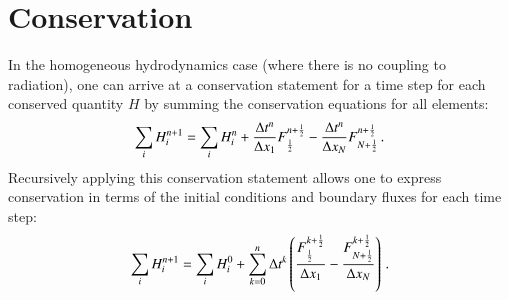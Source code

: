 \section{Conservation}
In the homogeneous hydrodynamics case (where there is no coupling to radiation),
one can arrive at a conservation statement for a time step for each conserved
quantity $H$ by summing the conservation equations for all elements:
\begin{equation}
   \sum\limits_i H_i^{n+1} = \sum\limits_i H_i^n
   + \frac{\Delta t^n}{\Delta x_1}F_{\frac{1}{2}}^{n+\frac{1}{2}}
   - \frac{\Delta t^n}{\Delta x_N}F_{N+\frac{1}{2}}^{n+\frac{1}{2}} \, .
\end{equation}
Recursively applying this conservation statement allows one to express
conservation in terms of the initial conditions and boundary fluxes
for each time step:
\begin{equation}
   \sum\limits_i H_i^{n+1} = \sum\limits_i H_i^0
   + \sum\limits_{k=0}^n \Delta t^k\left(
   \frac{F_{\frac{1}{2}}^{k+\frac{1}{2}}}{\Delta x_1}
   - \frac{F_{N+\frac{1}{2}}^{k+\frac{1}{2}}}{\Delta x_N}\right) \, .
\end{equation}
